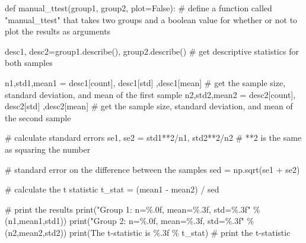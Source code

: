 \documentclass[
  letterpaper,
  DIV=11,
  numbers=noendperiod]{scrreprt}
\newenvironment{Shaded}{\begin{snugshade}}{\end{snugshade}}
\newcommand{\BuiltInTok}[1]{\textcolor[rgb]{0.00,0.23,0.31}{#1}}
\newcommand{\CommentTok}[1]{\textcolor[rgb]{0.37,0.37,0.37}{#1}}
\newcommand{\DecValTok}[1]{\textcolor[rgb]{0.68,0.00,0.00}{#1}}
\newcommand{\KeywordTok}[1]{\textcolor[rgb]{0.00,0.23,0.31}{#1}}
\newcommand{\NormalTok}[1]{\textcolor[rgb]{0.00,0.23,0.31}{#1}}
\newcommand{\OperatorTok}[1]{\textcolor[rgb]{0.37,0.37,0.37}{#1}}
\newcommand{\SpecialCharTok}[1]{\textcolor[rgb]{0.37,0.37,0.37}{#1}}
\newcommand{\StringTok}[1]{\textcolor[rgb]{0.13,0.47,0.30}{#1}}
\newcommand{\VariableTok}[1]{\textcolor[rgb]{0.07,0.07,0.07}{#1}}
\begin{document}
\begin{Shaded}
\begin{Highlighting}[]
\KeywordTok{def}\NormalTok{ manual\_ttest(group1, group2, plot}\OperatorTok{=}\VariableTok{False}\NormalTok{): }\CommentTok{\# define a function called "manual\_ttest" that takes two groups and a boolean value for whether or not to plot the results as arguments}
    
\NormalTok{    desc1, desc2}\OperatorTok{=}\NormalTok{group1.describe(), group2.describe() }\CommentTok{\# get descriptive statistics for both samples}
    
\NormalTok{    n1,std1,mean1 }\OperatorTok{=}\NormalTok{ desc1[}\StringTok{\textquotesingle{}count\textquotesingle{}}\NormalTok{], desc1[}\StringTok{\textquotesingle{}std\textquotesingle{}}\NormalTok{] ,desc1[}\StringTok{\textquotesingle{}mean\textquotesingle{}}\NormalTok{] }\CommentTok{\# get the sample size, standard deviation, and mean of the first sample}
\NormalTok{    n2,std2,mean2 }\OperatorTok{=}\NormalTok{ desc2[}\StringTok{\textquotesingle{}count\textquotesingle{}}\NormalTok{], desc2[}\StringTok{\textquotesingle{}std\textquotesingle{}}\NormalTok{] ,desc2[}\StringTok{\textquotesingle{}mean\textquotesingle{}}\NormalTok{] }\CommentTok{\# get the sample size, standard deviation, and mean of the second sample}
    
    \CommentTok{\# calculate standard errors}
\NormalTok{    se1, se2 }\OperatorTok{=}\NormalTok{ std1}\OperatorTok{**}\DecValTok{2}\OperatorTok{/}\NormalTok{n1, std2}\OperatorTok{**}\DecValTok{2}\OperatorTok{/}\NormalTok{n2 }\CommentTok{\# \textquotesingle{}**2\textquotesingle{} is the same as squaring the number}

    \CommentTok{\# standard error on the difference between the samples}
\NormalTok{    sed }\OperatorTok{=}\NormalTok{ np.sqrt(se1 }\OperatorTok{+}\NormalTok{ se2)}

    \CommentTok{\# calculate the t statistic}
\NormalTok{    t\_stat }\OperatorTok{=}\NormalTok{ (mean1 }\OperatorTok{{-}}\NormalTok{ mean2) }\OperatorTok{/}\NormalTok{ sed}

    \CommentTok{\# print the results}
    \BuiltInTok{print}\NormalTok{(}\StringTok{"Group 1: n=\%.0f, mean=}\SpecialCharTok{\%.3f}\StringTok{, std=}\SpecialCharTok{\%.3f}\StringTok{"} \OperatorTok{\%}\NormalTok{ (n1,mean1,std1)) }
    \BuiltInTok{print}\NormalTok{(}\StringTok{"Group 2: n=\%.0f, mean=}\SpecialCharTok{\%.3f}\StringTok{, std=}\SpecialCharTok{\%.3f}\StringTok{"} \OperatorTok{\%}\NormalTok{ (n2,mean2,std2))}
    \BuiltInTok{print}\NormalTok{(}\StringTok{\textquotesingle{}The t{-}statistic is }\SpecialCharTok{\%.3f}\StringTok{\textquotesingle{}} \OperatorTok{\%}\NormalTok{ t\_stat) }\CommentTok{\# print the t{-}statistic}


\end{Highlighting}
\end{Shaded}
\end{document}
